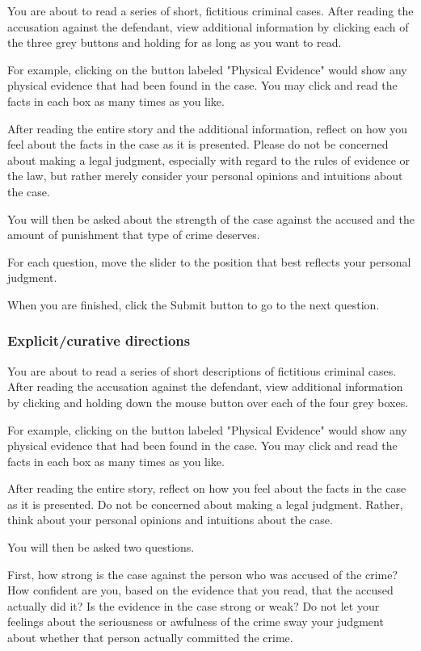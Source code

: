 \documentclass[
]{article}
\begin{document}
You are about to read a series of short, fictitious criminal cases.
After reading the accusation against the defendant, view additional
information by clicking each of the three grey buttons and holding for
as long as you want to read.

For example, clicking on the button labeled "Physical Evidence" would
show any physical evidence that had been found in the case. You may
click and read the facts in each box as many times as you like.

After reading the entire story and the additional information, reflect
on how you feel about the facts in the case as it is presented. Please
do not be concerned about making a legal judgment, especially with
regard to the rules of evidence or the law, but rather merely consider
your personal opinions and intuitions about the case.~

You will then be asked about the strength of the case against the
accused and the amount of punishment that type of crime deserves.

For each question, move the slider to the position that best reflects
your personal judgment.

When you are finished, click the Submit button to go to the next
question.

\hypertarget{explicitcurative-directions}{%
\subsubsection{Explicit/curative
directions}\label{explicitcurative-directions}}

You are about to read a series of short descriptions of fictitious
criminal cases. After reading the accusation against the defendant, view
additional information by clicking and holding down the mouse button
over each of the four grey boxes.

For example, clicking on the button labeled "Physical Evidence" would
show any physical evidence that had been found in the case. You may
click and read the facts in each box as many times as you like.

After reading the entire story, reflect on how you feel about the facts
in the case as it is presented. Do not be concerned about making a legal
judgment. Rather, think about your personal opinions and intuitions
about the case.

You will then be asked two questions.

First, how strong is the case against the person who was accused of the
crime? How confident are you, based on the evidence that you read, that
the accused actually did it? Is the evidence in the case strong or weak?
Do not let your feelings about the seriousness or awfulness of the crime
sway your judgment about whether that person actually committed the
crime.
\end{document}

